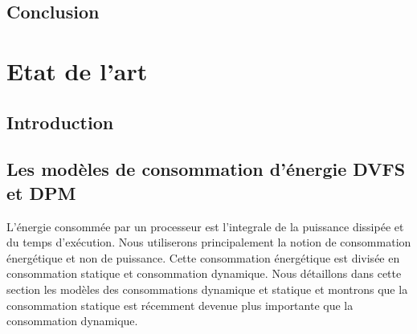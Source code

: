 \vspace{1cm}


\section{Conclusion}
\vspace{-1cm}
\chapter{Etat de l'art}
\minitoc
\section{Introduction}
\section{Les modèles de consommation d'énergie DVFS et DPM}
\vspace{-1cm}
L’énergie consommée par un processeur est l'integrale de la puissance dissipée et du temps d’exécution. Nous utiliserons principalement la notion de consommation énergétique et non de puissance. Cette consommation énergétique est divisée en consommation statique et consommation dynamique. Nous détaillons dans cette section les modèles des consommations dynamique et statique et montrons que la consommation statique est récemment devenue plus importante que la consommation dynamique.

